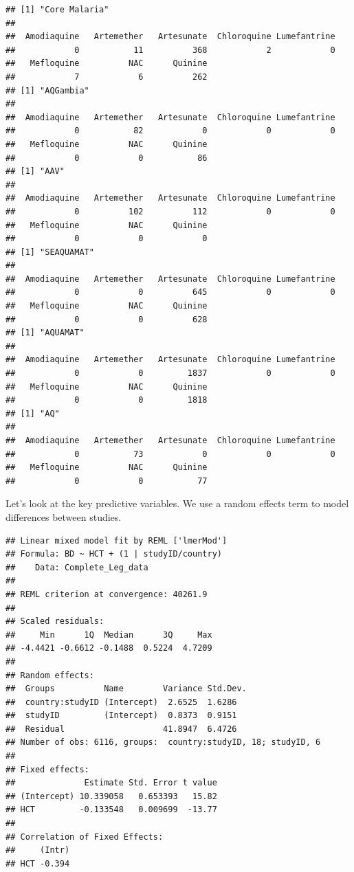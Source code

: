 \documentclass[]{article}
\begin{document}
\begin{verbatim}
## [1] "Core Malaria"
## 
##  Amodiaquine   Artemether   Artesunate  Chloroquine Lumefantrine 
##            0           11          368            2            0 
##   Mefloquine          NAC      Quinine 
##            7            6          262 
## [1] "AQGambia"
## 
##  Amodiaquine   Artemether   Artesunate  Chloroquine Lumefantrine 
##            0           82            0            0            0 
##   Mefloquine          NAC      Quinine 
##            0            0           86 
## [1] "AAV"
## 
##  Amodiaquine   Artemether   Artesunate  Chloroquine Lumefantrine 
##            0          102          112            0            0 
##   Mefloquine          NAC      Quinine 
##            0            0            0 
## [1] "SEAQUAMAT"
## 
##  Amodiaquine   Artemether   Artesunate  Chloroquine Lumefantrine 
##            0            0          645            0            0 
##   Mefloquine          NAC      Quinine 
##            0            0          628 
## [1] "AQUAMAT"
## 
##  Amodiaquine   Artemether   Artesunate  Chloroquine Lumefantrine 
##            0            0         1837            0            0 
##   Mefloquine          NAC      Quinine 
##            0            0         1818 
## [1] "AQ"
## 
##  Amodiaquine   Artemether   Artesunate  Chloroquine Lumefantrine 
##            0           73            0            0            0 
##   Mefloquine          NAC      Quinine 
##            0            0           77
\end{verbatim}

Let's look at the key predictive variables. We use a random effects term
to model differences between studies.

\begin{verbatim}
## Linear mixed model fit by REML ['lmerMod']
## Formula: BD ~ HCT + (1 | studyID/country)
##    Data: Complete_Leg_data
## 
## REML criterion at convergence: 40261.9
## 
## Scaled residuals: 
##     Min      1Q  Median      3Q     Max 
## -4.4421 -0.6612 -0.1488  0.5224  4.7209 
## 
## Random effects:
##  Groups          Name        Variance Std.Dev.
##  country:studyID (Intercept)  2.6525  1.6286  
##  studyID         (Intercept)  0.8373  0.9151  
##  Residual                    41.8947  6.4726  
## Number of obs: 6116, groups:  country:studyID, 18; studyID, 6
## 
## Fixed effects:
##              Estimate Std. Error t value
## (Intercept) 10.339058   0.653393   15.82
## HCT         -0.133548   0.009699  -13.77
## 
## Correlation of Fixed Effects:
##     (Intr)
## HCT -0.394
\end{verbatim}
\end{document}
